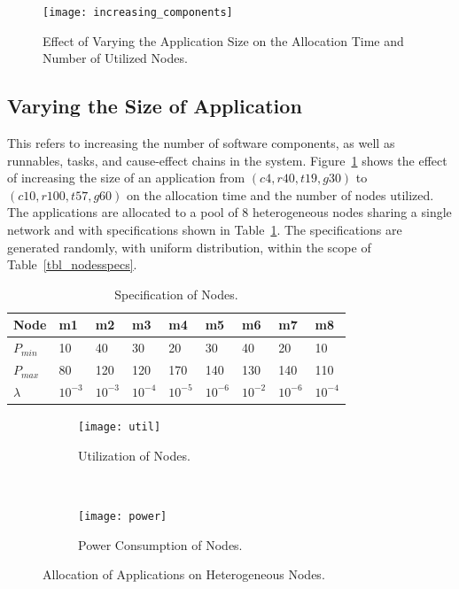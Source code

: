 \begin{figure}[t!]
\centering
\texttt{[image: increasing\_components]}
\caption{Effect of Varying the Application Size on the Allocation Time and Number of Utilized Nodes.}
\label{fig_increasing_components}
\end{figure}


\usepackage{Extended Performance Analysis}
\subsection{Varying the Size of Application} 
This refers to increasing the number of software components, as well as runnables, tasks, and cause-effect chains in the system. Figure~\ref{fig_increasing_components} shows the effect of increasing the size of an application from $(c4,r40,t19,g30)$ to $(c10,r100,t57,g60)$ on the allocation time and  the number of nodes utilized. The applications are allocated to a pool of 8 heterogeneous nodes sharing a single network and with specifications shown in Table~\ref{tbl_nodesspecs_exp}. The specifications are generated randomly, with uniform distribution, within the scope of Table~\ref{tbl_nodesspecs}.
\begin{table}
\centering\small
\setlength{\tabcolsep}{4pt}
\begin{tabular}{@{}lllllllll@{}}
\toprule
Node  		& m1 & m2 & m3 & m4&m5&m6&m7&m8\\ 
\midrule
$P_{min}$ & 10 	& 40 	&	30 	&	20 	& 30 	& 	40	&	20&	10\\
$P_{max}$ & 80	& 120	&	120	&	170	&	140	&	130	&	140 &110\\
$\lambda$  &$10^{-3}$	&$10^{-3}$	&$10^{-4}$&$10^{-5}$&$10^{-6}$&$10^{-2}$&$10^{-6}$&$10^{-4}$\\
\bottomrule
\end{tabular}
\caption{Specification of Nodes.}
\label{tbl_nodesspecs_exp}\vspace{-0.4cm}
\end{table}
\begin{figure}
    \centering
    \begin{subfigure}[b]{0.4  \textwidth}
        \texttt{[image: util]}
        \caption{Utilization of Nodes.}
        \label{fig_util}
    \end{subfigure}
    ~%
        \begin{subfigure}[b]{0.4\textwidth}
        \texttt{[image: power]}
        \caption{Power Consumption of Nodes.}
        \label{fig_power}
    \end{subfigure}
    \caption{Allocation of Applications on Heterogeneous Nodes.}
    \label{fig_util_power}\vspace{-0.2cm}
\end{figure}

